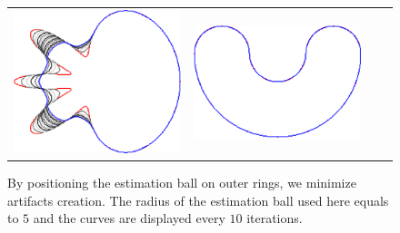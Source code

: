 {\begin{figure}
\begin{tabular}{p{3em}ccc}
\includegraphics[scale=0.25]{figures/chapter6/level-effect/flower/improve/len_pen0/radius-5/level5/summary.pdf} &
\includegraphics[scale=0.25]{figures/chapter6/level-effect/bean/improve/len_pen0/radius-5/level5/summary.pdf} \\[2em]
\end{tabular}
\caption{By positioning the estimation ball on outer rings, we minimize artifacts creation. The radius of the estimation ball used here equals to $5$ and the curves are displayed every $10$ iterations. \label{fig:mrings-r5-evolution}}
\end{figure}


}
